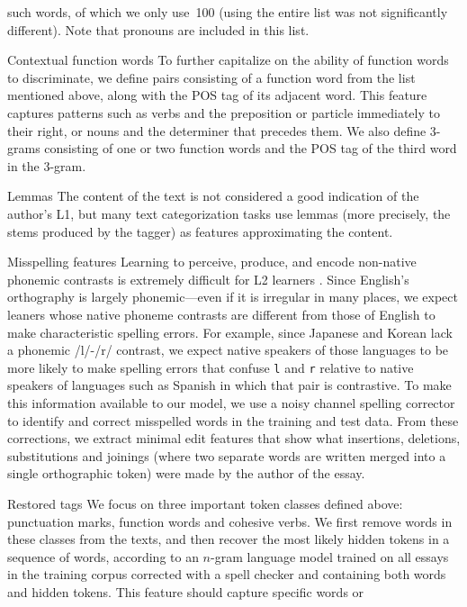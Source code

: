 \documentclass[11pt,letterpaper]{article}
\begin{document}
\begin{compactdesc}
  such words, of which we only use~100 (using the entire list was not
  significantly different). Note that pronouns are included in this list.
\item[Contextual function words] To further capitalize on the ability
  of function words to discriminate, we define pairs consisting of a
  function word from the list mentioned above, along with the POS tag
  of its adjacent word. This feature captures patterns such as verbs
  and the preposition or particle immediately to their right, or nouns
  and the determiner that precedes them. We also define 3-grams
  consisting of one or two function words and the POS tag of the third
  word in the 3-gram.
\item[Lemmas] The content of the text is not considered a good
  indication of the author's L1, but many text categorization tasks
  use lemmas (more precisely, the stems produced by the tagger) as
  features approximating the content.
\item[Misspelling features] Learning to perceive, produce, and encode non-native phonemic contrasts is extremely difficult for L2 learners \citep{hayes-harb:2008}. Since English's orthography is largely phonemic---even if it is irregular in many places, we expect leaners whose native phoneme contrasts are different from those of English to make characteristic spelling errors. For example, since Japanese and Korean lack a phonemic /l/-/r/ contrast, we expect native speakers of those languages to be more likely to make spelling errors that confuse {\tt l} and {\tt r} relative to native speakers of languages such as Spanish in which that pair is contrastive. To make this information available to our model, we use a noisy channel spelling corrector \citep{kernighan:1990} to identify and correct misspelled words in the training and test data. From these corrections, we extract minimal edit features that show what insertions, deletions, substitutions and joinings (where two separate words are written merged into a single orthographic token) were made by the author of the essay.
\item[Restored tags] We focus on three important token classes defined
  above: punctuation marks, function words and cohesive verbs. We
  first remove words in these classes from the texts, and then recover
  the most likely hidden tokens in a sequence of words, according to
  an $n$-gram language model trained on all essays in the training
  corpus corrected with a spell checker and containing both words and
  hidden tokens. This feature should capture specific words or

\end{compactdesc}
\end{document}
